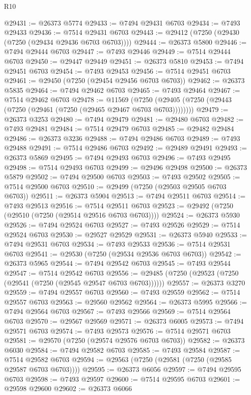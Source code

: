 \begin{lexlean}{R10}
\begin{coremodule}
@29431 := @26373 @5774
@29433 := @7494 @29431 @6703
@29434 := @7493 @29433
@29436 := @7514 @29431 @6703
@29443 := @29412 (@7250 (@29430 (@7250 (@29434 @29436 @6703 @6703))))
@29444 := @26373 @5800
@29446 := @7494 @29444 @6703
@29447 := @7493 @29446
@29449 := @7514 @29444 @6703
@29450 := @29447 @29449
@29451 := @26373 @5810
@29453 := @7494 @29451 @6703
@29454 := @7493 @29453
@29456 := @7514 @29451 @6703
@29461 := @29450 (@7250 (@29454 @29456 @6703 @6703))
@29462 := @26373 @5835
@29464 := @7494 @29462 @6703
@29465 := @7493 @29464
@29467 := @7514 @29462 @6703
@29478 := @11569
    (@7250 (@29405 (@7250 (@29443 (@7250 (@29461 (@7250 (@29465 @29467 @6703 @6703))))))))
@29479 := @26373 @3253
@29480 := @7494 @29479
@29481 := @29480 @6703
@29482 := @7493 @29481
@29484 := @7514 @29479 @6703
@29485 := @29482 @29484
@29486 := @26373 @3236
@29488 := @7494 @29486 @6703
@29489 := @7493 @29488
@29491 := @7514 @29486 @6703
@29492 := @29489 @29491
@29493 := @26373 @5869
@29495 := @7494 @29493 @6703
@29496 := @7493 @29495
@29498 := @7514 @29493 @6703
@29499 := @29496 @29498
@29500 := @26373 @5879
@29502 := @7494 @29500 @6703
@29503 := @7493 @29502
@29505 := @7514 @29500 @6703
@29510 := @29499 (@7250 (@29503 @29505 @6703 @6703))
@29511 := @26373 @5904
@29513 := @7494 @29511 @6703
@29514 := @7493 @29513
@29516 := @7514 @29511 @6703
@29523 := @29492 (@7250 (@29510 (@7250 (@29514 @29516 @6703 @6703))))
@29524 := @26373 @5930
@29526 := @7494 @29524 @6703
@29527 := @7493 @29526
@29529 := @7514 @29524 @6703
@29530 := @29527 @29529
@29531 := @26373 @5940
@29533 := @7494 @29531 @6703
@29534 := @7493 @29533
@29536 := @7514 @29531 @6703
@29541 := @29530 (@7250 (@29534 @29536 @6703 @6703))
@29542 := @26373 @5965
@29544 := @7494 @29542 @6703
@29545 := @7493 @29544
@29547 := @7514 @29542 @6703
@29556 := @29485 (@7250 (@29523 (@7250 (@29541 (@7250 (@29545 @29547 @6703 @6703))))))
@29557 := @26373 @3270
@29559 := @7494 @29557 @6703
@29560 := @7493 @29559
@29562 := @7514 @29557 @6703
@29563 := @29560 @29562
@29564 := @26373 @5995
@29566 := @7494 @29564 @6703
@29567 := @7493 @29566
@29569 := @7514 @29564 @6703
@29570 := @29567 @29569
@29571 := @26373 @6005
@29573 := @7494 @29571 @6703
@29574 := @7493 @29573
@29576 := @7514 @29571 @6703
@29581 := @29570 (@7250 (@29574 @29576 @6703 @6703))
@29582 := @26373 @6030
@29584 := @7494 @29582 @6703
@29585 := @7493 @29584
@29587 := @7514 @29582 @6703
@29594 := @29563 (@7250 (@29581 (@7250 (@29585 @29587 @6703 @6703))))
@29595 := @26373 @6056
@29597 := @7494 @29595 @6703
@29598 := @7493 @29597
@29600 := @7514 @29595 @6703
@29601 := @29598 @29600
@29602 := @26373 @6066

\end{coremodule}
\end{lexlean}
